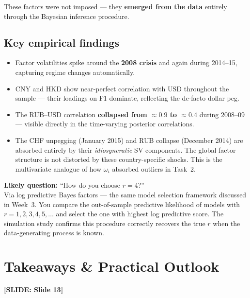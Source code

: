 \documentclass[11pt, a4paper]{article}\usepackage[]{graphicx}\usepackage[]{xcolor}
\newcommand{\slidetag}[1]{%
  \noindent\textcolor{MainBlue}{\footnotesize\textbf{[SLIDE: #1]}}%
  \vspace{0.2em}\par
}
\newcommand{\stress}[1]{\textbf{#1}}
\begin{document}
These factors were not imposed --- they \stress{emerged from the data}
entirely through the Bayesian inference procedure.

\subsection{Key empirical findings}

\begin{itemize}[itemsep=4pt]
  \item Factor volatilities spike around the \stress{2008 crisis} and again
        during 2014--15, capturing regime changes automatically.
  \item CNY and HKD show near-perfect correlation with USD throughout the
        sample --- their loadings on F1 dominate, reflecting the de-facto
        dollar peg.
  \item The RUB--USD correlation \stress{collapsed from $\approx 0.9$ to
        $\approx 0.4$} during 2008--09 --- visible directly in the
        time-varying posterior correlations.
  \item The CHF unpegging (January 2015) and RUB collapse (December 2014)
        are absorbed entirely by their \textit{idiosyncratic} SV components.
        The global factor structure is not distorted by these country-specific
        shocks.  This is the multivariate analogue of how $\omega_i$ absorbed
        outliers in Task~2.
\end{itemize}

\begin{remarkbox}
  \textbf{Likely question:} ``How do you choose $r = 4$?''\\
  Via log predictive Bayes factors --- the same model selection framework
  discussed in Week~3.  You compare the out-of-sample predictive likelihood
  of models with $r = 1, 2, 3, 4, 5, \ldots$ and select the one with
  highest log predictive score.  The simulation study confirms this procedure
  correctly recovers the true $r$ when the data-generating process is known.
\end{remarkbox}

\section{Takeaways \& Practical Outlook}

\slidetag{Slide 13}
\end{document}

